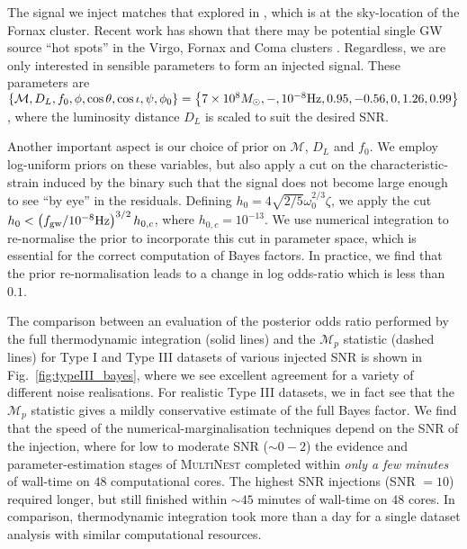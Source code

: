 \documentclass[twocolappendix,tighten]{emulateapj}
\begin{document}

The signal we inject matches that explored in \citet{ellisbayesian2013}, which is at the sky-location of the Fornax cluster. Recent work has shown that there may be potential single GW source ``hot spots'' in the Virgo, Fornax and Coma clusters \citep{fornax-hotspot}. Regardless, we are only interested in sensible parameters to form an injected signal. These parameters are $\left\{\mathcal{M},D_L,f_0,\phi,\cos\theta,\cos\iota,\psi,\phi_0\right\} = \left\{7\times10^8M_{\odot},-,10^{-8}{\rm Hz},0.95,-0.56,0,1.26,0.99\right\}$, where the luminosity distance $D_L$ is scaled to suit the desired SNR. 

Another important aspect is our choice of prior on $\mathcal{M}$, $D_L$ and $f_0$. We employ log-uniform priors on these variables, but also apply a cut on the characteristic-strain induced by the binary such that the signal does not become large enough to see ``by eye'' in the residuals. Defining $h_0 = 4\sqrt{2/5}\omega_0^{2/3}\zeta$, we apply the cut $h_0 < \left(f_{\rm gw} / 10^{-8}{\rm Hz}\right)^{3/2}h_{0,c}$, where $h_{0,c}=10^{-13}$. We use numerical integration to re-normalise the prior to incorporate this cut in parameter space, which is essential for the correct computation of Bayes factors. In practice, we find that the prior re-normalisation leads to a change in log odds-ratio which is less than $0.1$.

The comparison between an evaluation of the posterior odds ratio performed by the full thermodynamic integration (solid lines) and the {\bf $\mathcal{M}_p$} statistic (dashed lines) for Type I and Type III datasets of various injected SNR is shown in Fig.\ \ref{fig:typeIII_bayes}, where we see excellent agreement for a variety of different noise realisations. For realistic Type III datasets, we in fact see that the {\bf $\mathcal{M}_p$} statistic gives a mildly conservative estimate of the full Bayes factor. We find that the speed of the numerical-marginalisation techniques depend on the SNR of the injection, where for low to moderate SNR ($\sim 0 - 2$) the evidence and parameter-estimation stages of \textsc{MultiNest} completed within {\it only a few minutes} of wall-time on $48$ computational cores. The highest SNR injections (SNR $=10$) required longer, but still finished within $\sim 45$ minutes of wall-time on $48$ cores. In comparison, thermodynamic integration took more than a day for a single dataset analysis with similar computational resources. %
\end{document}
